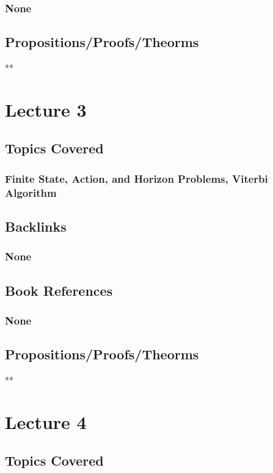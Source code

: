 \documentclass[11pt]{article}
\begin{document}
\subsubsection*{None}
\label{sec:org0194db5}
\subsection*{Propositions/Proofs/Theorms}
\label{sec:org223ee1a}
**

\section*{Lecture 3}
\label{sec:org7edbfb4}
\subsection*{Topics Covered}
\label{sec:org5dd652f}
\subsubsection*{Finite State, Action, and Horizon Problems, Viterbi Algorithm}
\label{sec:orgb9bc160}
\subsection*{Backlinks}
\label{sec:orgdf9ddb4}
\subsubsection*{None}
\label{sec:org8b990d5}
\subsection*{Book References}
\label{sec:orgd601b87}
\subsubsection*{None}
\label{sec:org7c0ccdc}
\subsection*{Propositions/Proofs/Theorms}
\label{sec:org9010ac2}
**

\section*{Lecture 4}
\label{sec:org3044e6b}
\subsection*{Topics Covered}
\label{sec:org3953dd1}
\end{document}
